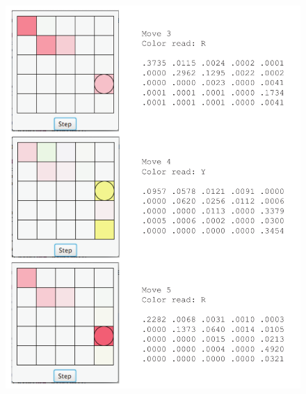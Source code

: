 \documentclass{article}
\begin{document}
\begin{figure}[H]
\centering
\includegraphics[scale=0.8]{example2.pdf}
\end{figure}
\end{document}
